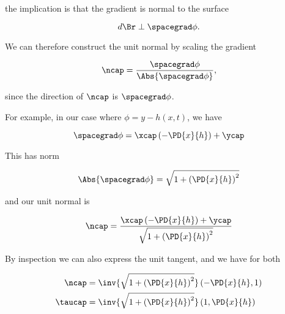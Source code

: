 the implication is that the gradient is normal to the surface

\begin{equation}\label{eqn:continuumL13:380}
d\Br \perp \spacegrad \phi.
\end{equation}

We can therefore construct the unit normal by scaling the gradient

\begin{equation}\label{eqn:continuumL13:260}
\ncap = \frac{\spacegrad \phi}{\Abs{\spacegrad \phi}},
\end{equation}

since the direction of $\ncap$ is $\spacegrad \phi$.

For example, in our case where $\phi = y - h(x, t)$, we have

\begin{equation}\label{eqn:continuumL13:280}
\spacegrad \phi = \xcap \left( -\PD{x}{h} \right) + \ycap
\end{equation}

This has norm

\begin{equation}\label{eqn:continuumL13:300}
\Abs{\spacegrad \phi} = \sqrt{ 1 + \left( \PD{x}{h} \right)^2 }
\end{equation}

and our unit normal is

\begin{equation}\label{eqn:continuumL13:320}
\ncap = 
\frac{\xcap \left( -\PD{x}{h} \right) + \ycap}{
\sqrt{ 1 + \left( \PD{x}{h} \right)^2 }
}
\end{equation}

By inspection we can also express the unit tangent, and we have for both

\begin{align}\label{eqn:continuumL13:340}
\ncap &= 
\inv{
\sqrt{ 1 + \left( \PD{x}{h} \right)^2 }
}
\left( -\PD{x}{h}, 1 \right)  \\
\taucap &= 
\inv{
\sqrt{ 1 + \left( \PD{x}{h} \right)^2 }
}
\left( 1, \PD{x}{h} \right)
\end{align}

\EndNoBibArticle
